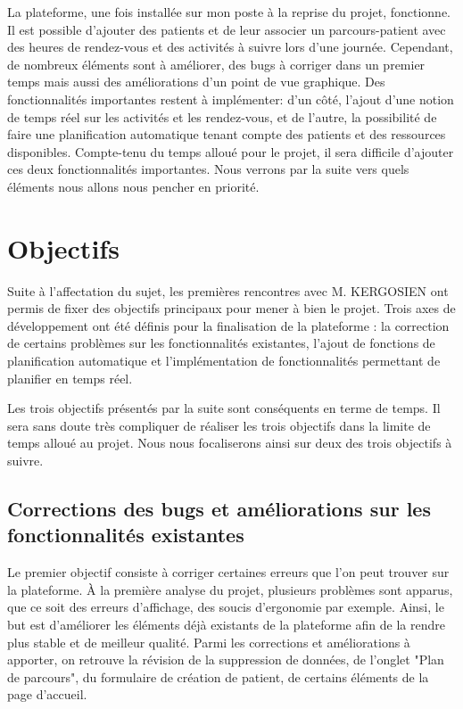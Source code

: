 \documentclass{polytech/polytech}
\begin{document}
La plateforme, une fois installée sur mon poste à la reprise du projet, fonctionne. Il est possible d'ajouter des patients et de leur associer un parcours-patient avec des heures de rendez-vous et des activités à suivre lors d'une journée. Cependant, de nombreux éléments sont à améliorer, des bugs à corriger dans un premier temps mais aussi des améliorations d'un point de vue graphique. Des fonctionnalités importantes restent à implémenter: d'un côté, l'ajout d'une notion de temps réel sur les activités et les rendez-vous, et de l'autre, la possibilité de faire une planification automatique tenant compte des patients et des ressources disponibles. Compte-tenu du temps alloué pour le projet, il sera difficile d'ajouter ces deux fonctionnalités importantes. Nous verrons par la suite vers quels éléments nous allons nous pencher en priorité. 


\section{Objectifs}


Suite à l'affectation du sujet, les premières rencontres avec M. KERGOSIEN ont permis de fixer des objectifs principaux pour mener à bien le projet. Trois axes de développement ont été définis pour la finalisation de la plateforme : la correction de certains problèmes sur les fonctionnalités existantes, l'ajout de fonctions de planification automatique et l'implémentation de fonctionnalités permettant de planifier en temps réel. 

Les trois objectifs présentés par la suite sont conséquents en terme de temps. Il sera sans doute très compliquer de réaliser les trois objectifs dans la limite de temps alloué au projet. Nous nous focaliserons ainsi sur deux des trois objectifs à suivre. 


\subsection{Corrections des bugs et améliorations sur les fonctionnalités existantes}

Le premier objectif consiste à corriger certaines erreurs que l'on peut trouver sur la plateforme. À la première analyse du projet, plusieurs problèmes sont apparus, que ce soit des erreurs d'affichage, des soucis d'ergonomie par exemple. Ainsi, le but est d'améliorer les éléments déjà existants de la plateforme afin de la rendre plus stable et de meilleur qualité. Parmi les corrections et améliorations à apporter, on retrouve la révision de la suppression de données, de l'onglet "Plan de parcours", du formulaire de création de patient, de certains éléments de la page d'accueil. 
\end{document}
